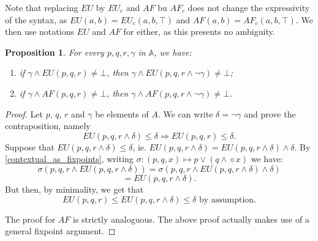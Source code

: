 \documentclass[11pt]{article}
\newcommand{\A}{{\mathbb A}}
\newtheorem{proposition}[definition]{Proposition}
\begin{document}
Note that replacing $EU$ by $EU_c$ and $AF$ bu $AF_c$ does not change the expressivity of the syntax, as $EU(a,b)=EU_c(a,b,\top)$ and $AF(a,b)=AF_c(a,b,\top)$. We then use notations $EU$ and $AF$ for either, as this presents no ambiguity.
\begin{proposition}\label{context_rule_gamma}
    For every $p,q,r,\gamma$ in $\A$, we have:
    \begin{enumerate}
        \item if $\gamma \wedge EU(p,q,r) \neq \bot$, then $\gamma \wedge EU(p,q,r\wedge\neg\gamma)\neq\bot$;
        \item if $\gamma \wedge AF(p,q,r) \neq \bot$, then $\gamma \wedge AF(p,q,r\wedge\neg\gamma)\neq\bot$.
    \end{enumerate}
\end{proposition}
\begin{proof}
    Let $p$, $q$, $r$ and $\gamma$ be elements of $A$. We can write $\delta = \neg\gamma$ and prove the contraposition, namely\[EU(p,q,r\wedge \delta)\leq \delta\Rightarrow EU(p,q,r)\leq \delta.\] Suppose that $EU(p,q,r\wedge \delta)\leq \delta$, ie. $EU(p,q,r\wedge \delta)=EU(p,q,r\wedge \delta)\wedge\delta$. By \ref{contextual_as_fixpoints}, writing $\sigma: (p,q,x)\mapsto p\vee(q\wedge\diamond x) $ we have:\[\sigma(p,q,r\wedge EU(p,q,r\wedge \delta))=\sigma(p,q,r\wedge EU(p,q,r\wedge \delta)\wedge\delta)\]\[=EU(p,q,r\wedge \delta).\]But then, by minimality, we get that \[EU(p,q,r)\leq EU(p,q,r\wedge \delta)\leq\delta\mbox{ by assumption.}\]
    
    The proof for $AF$ is strictly analoguous. The above proof actually makes use of a general fixpoint argument.
\end{proof}
\end{document}
